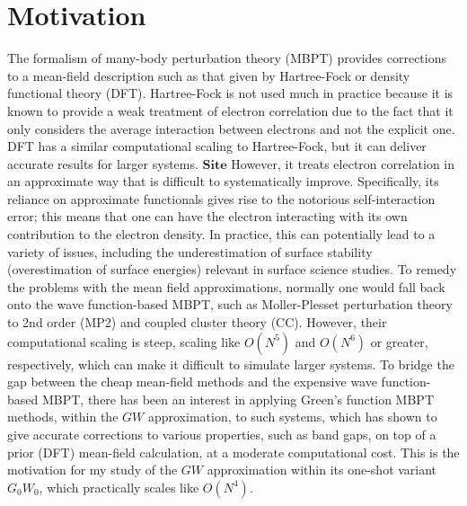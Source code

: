 \documentclass[12pt]{caltech_thesis}
\begin{document}
\chapter{Motivation}
The formalism of many-body perturbation theory (MBPT) provides corrections to a mean-field description such as that given by Hartree-Fock or density functional theory (DFT). Hartree-Fock is not used much in practice because it is known to provide a weak treatment of electron correlation due to the fact that it only considers the average interaction between electrons and not the explicit one. DFT has a similar computational scaling to Hartree-Fock, but it can deliver accurate results for larger systems. $\textbf{Site}$ However, it treats electron correlation in an approximate way that is difficult to systematically improve. Specifically, its reliance on approximate functionals gives rise to the notorious self-interaction error; this means that one can have the electron interacting with its own contribution to the electron density. In practice, this can potentially lead to a variety of issues, including the underestimation of surface stability (overestimation of surface energies) relevant in surface science studies. \autocite{schimka_accurate_2010} \autocite{kozlowski_elucidating_2021} To remedy the problems with the mean field approximations, normally one would fall back onto the wave function-based MBPT, such as Moller-Plesset perturbation theory to 2nd order (MP2) and coupled cluster theory (CC). However, their computational scaling is steep, scaling like $O(N^5)$ and $O(N^6)$ or greater, respectively, which can make it difficult to simulate larger systems. \autocite{mcclain_gaussian-based_2017} To bridge the gap between the cheap mean-field methods and the expensive wave function-based MBPT, there has been an interest in applying Green's function MBPT methods, within the $GW$ approximation, to such systems, which has shown to give accurate corrections to various properties, such as band gaps, on top of a prior (DFT) mean-field calculation, at a moderate computational cost. \autocite{noauthor_frontiers_nodate} This is the motivation for my study of the $GW$ approximation within its one-shot variant $G_0W_0$, which practically scales like $O(N^4)$.
\end{document}
